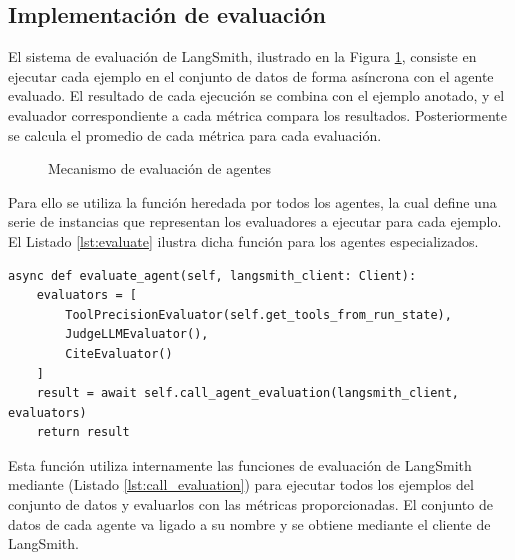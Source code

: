\subsection{Implementación de evaluación}
\label{sec:langsmith}
El sistema de evaluación de LangSmith, ilustrado en la Figura \ref{fig:mem_1}, consiste en ejecutar cada ejemplo en el conjunto de datos de forma asíncrona con el agente evaluado. El resultado de cada ejecución se combina con el ejemplo anotado, y el evaluador correspondiente a cada métrica compara los resultados. Posteriormente se calcula el promedio de cada métrica para cada evaluación.

\begin{figure}[h]
\centering
{}
\caption{Mecanismo de evaluación de agentes}
\label{fig:mem_1}
\end{figure}

Para ello se utiliza la función  heredada por todos los agentes, la cual define una serie de instancias  que representan los evaluadores a ejecutar para cada ejemplo. El Listado \ref{lst:evaluate} ilustra dicha función para los agentes especializados.

\begin{lstlisting}[caption={Evaluación de agentes especializados},label={lst:evaluate}]
async def evaluate_agent(self, langsmith_client: Client):
    evaluators = [
        ToolPrecisionEvaluator(self.get_tools_from_run_state),
        JudgeLLMEvaluator(),
        CiteEvaluator()
    ]
    result = await self.call_agent_evaluation(langsmith_client, evaluators)
    return result
\end{lstlisting}

Esta función utiliza internamente las funciones de evaluación de LangSmith mediante  (Listado \ref{lst:call_evaluation}) para ejecutar todos los ejemplos del conjunto de datos y evaluarlos con las métricas proporcionadas. El conjunto de datos de cada agente va ligado a su nombre y se obtiene mediante el cliente de LangSmith.

